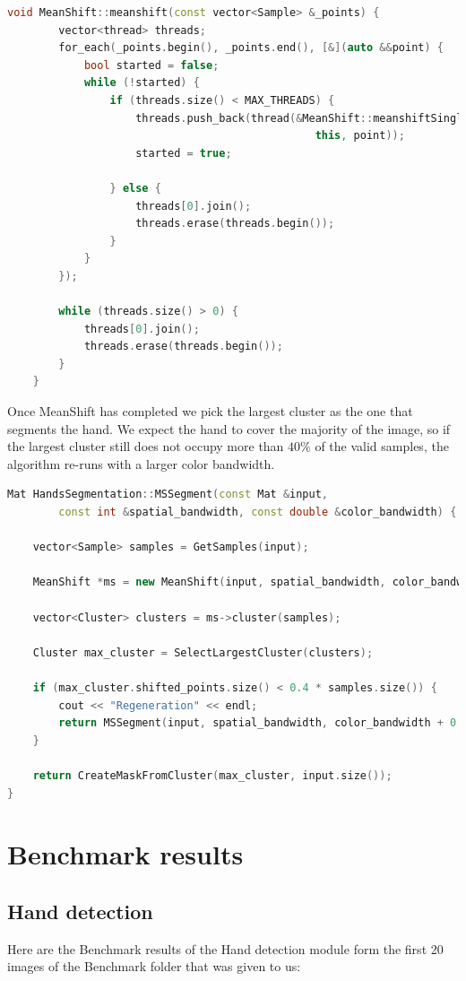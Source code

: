 \begin{lstlisting}[language = c++]    
    void MeanShift::meanshift(const vector<Sample> &_points) {
        vector<thread> threads;
        for_each(_points.begin(), _points.end(), [&](auto &&point) {
            bool started = false;
            while (!started) {
                if (threads.size() < MAX_THREADS) {
                    threads.push_back(thread(&MeanShift::meanshiftSinglePoint, 
                                                this, point));
                    started = true;
    
                } else {
                    threads[0].join();
                    threads.erase(threads.begin());
                }
            }
        });
    
        while (threads.size() > 0) {
            threads[0].join();
            threads.erase(threads.begin());
        }
    }
\end{lstlisting}

Once MeanShift has completed we pick the largest cluster as the one
that segments the hand. We expect the hand to cover the majority of the image,
so if the largest cluster still does not occupy more than $40\%$ of the valid
samples, the algorithm re-runs with a larger color bandwidth.

\begin{lstlisting}[language = c++]
Mat HandsSegmentation::MSSegment(const Mat &input, 
        const int &spatial_bandwidth, const double &color_bandwidth) {

    vector<Sample> samples = GetSamples(input);

    MeanShift *ms = new MeanShift(input, spatial_bandwidth, color_bandwidth);

    vector<Cluster> clusters = ms->cluster(samples);

    Cluster max_cluster = SelectLargestCluster(clusters);

    if (max_cluster.shifted_points.size() < 0.4 * samples.size()) {
        cout << "Regeneration" << endl;
        return MSSegment(input, spatial_bandwidth, color_bandwidth + 0.5);
    }

    return CreateMaskFromCluster(max_cluster, input.size());
}
\end{lstlisting}
\newpage
\section{Benchmark results}

\subsection{Hand detection}
Here are the Benchmark results of the Hand detection module form the first 20 images of the Benchmark folder that was given to us:

